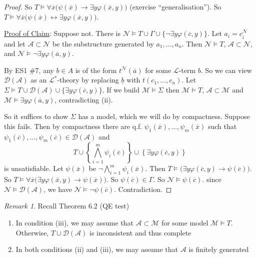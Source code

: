 \documentclass[]{article}
\theoremstyle{custhm}
\theoremstyle{cusdef}
\theoremstyle{custhm}
\theoremstyle{custhm}
\theoremstyle{custhm}
\theoremstyle{ex}
\theoremstyle{custhm}
\theoremstyle{cusdef}
\theoremstyle{remark}
\newtheorem*{remark*}{Remark}
\theoremstyle{remark}
\renewcommand{\L}{\mathcal{L}}
\newcommand{\M}{\mathcal{M}}
\renewcommand{\phi}{\varphi}
\renewcommand{\bar}{\overline}
\newcommand{\N}{\mathcal{N}}
\newcommand{\A}{\mathcal{A}}
\newcommand{\D}{\mathcal{D}}
\begin{document}
\begin{proof}
So $T\models \forall \bar{x}\big(\psi(\bar{x}) \rightarrow \exists y \phi(\bar{x},y)\big)$ (exercise ``generalisation''). So $T\models \forall \bar{x}\big(\psi(\bar{x})\leftrightarrow \exists y\phi(\bar{x},y)\big)$.

\underline{Proof of Claim}: Suppose not. There is $\N\models T\cup\Gamma \cup \{\neg \exists y\phi(\bar{c},y)\}$. Let $a_i = c_i^\N$ and let $\A\subset\N$ be the substructure generated by $a_1,\dots,a_n$. Then $\N\models T$, $\A\subset\N$, and $\N\models \neg \exists y\phi(\bar{a},y)$.

By ES1 \#7, any $b \in A$ is of the form $t^\N(\bar{a})$ for some $\L$-term $b$. So we can view $\D(\A)$ as an $\L^\ast$-theory by replacing $\underline{b}$ with $t(c_1,\dots,c_n)$. Let $\Sigma\models T\cup\D(\A)\cup\{\exists y\phi(\bar{c},y)\}$. If we build $\M\models \Sigma$ then $\M\models T$, $\A\subset \M$ and $\M\models \exists y \phi(\bar{a},y)$, contradicting (ii).

So it suffices to show $\Sigma$ has a model, which we will do by compactness. Suppose this fails. Then by compactness there are q.f. $\psi_1(\bar{x}),\dots,\psi_m(\bar{x})$ such that $\psi_1(\bar{c}),\dots,\psi_m(\bar{c})\in\D(\A)$ and $$ T\cup \left\lbrace \bigwedge_{i=1}^{m}\psi_i(\bar{c})\right\rbrace \cup \left\lbrace \exists y \phi(\bar{c},y)\right\rbrace$$ is unsatisfiable. Let $\psi(\bar{x})$ be $\neg \bigwedge_{i=1}^{m}\psi_i(\bar{x})$. Then $T\models \big(\exists y\phi(\bar{c},y)\rightarrow \psi(\bar{c})\big)$. So $T\models \forall \bar{x} \big(\exists y \phi(\bar{x},y)\rightarrow\psi(\bar{x})\big)$. So $\psi(\bar{c})\in \Gamma$. So $\N\models \psi(\bar{c})$. since $\N\models \D(\A)$, we have $\N\models \neg \psi(\bar{c})$. Contradiction.
\end{proof}



\begin{remark*}
Recall Theorem 6.2 (QE test)
\begin{enumerate}[label=\arabic*)]
	\item In condition (iii), we may assume that $\A\subset\M$ for some model $\M\models T$. Otherwise, $T\cup \D(\A)$ is inconsistent and thus complete
	\item In both conditions (ii) and (iii), we may assume that $\A$ is finitely generated
\end{enumerate}
\end{remark*}
\end{document}
